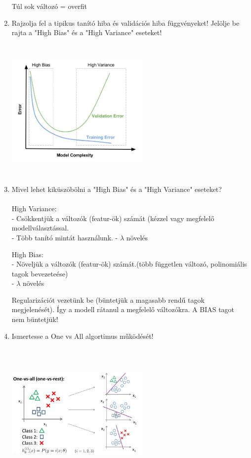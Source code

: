 \documentclass[12pt]{article}
\begin{document}
\begin{enumerate}
Túl sok változó = overfit
\newpage
\item Rajzolja fel a tipikus tanító hiba és validációs hiba függvényeket! Jelölje be rajta a "High Bias" és a "High Variance" eseteket!\\
\begin{center}
\includegraphics[width=7cm,height=7cm,keepaspectratio]{./pics/TrainValidError.jpg}
\end{center}

\item Mivel lehet kiküszöbölni a "High Bias" és a "High Variance" eseteket?\\
\\
High Variance:\\
- Csökkentjük a változók (featur-ök) számát (kézzel vagy megfelelő modellválasztással.\\
- Több tanító mintát használunk.
- $\lambda$ növelés

High Bias:\\
- Növeljük a változók (featur-ök) számát.(több független változó, polinomiális tagok bevezeteése)\\
- $\lambda$ növelés


Regularizációt vezetünk be (büntetjük a magasabb rendű tagok megjelenését). Így a modell rátanul a megfelelő változókra. A BIAS tagot nem büntetjük!

\newpage
\item Ismertesse a One vs All algortimus működését!\\
\begin{center}
\includegraphics[width=7cm,height=7cm,keepaspectratio]{./pics/OneVsAll.jpg}
\end{center}


\end{enumerate}
\end{document}
